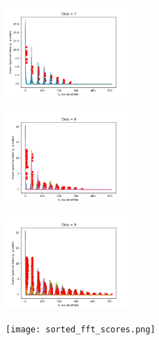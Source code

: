 \begin{center}
\includegraphics[width=0.35\textwidth]{fft_7.png}
\end{center}

\begin{center}
\includegraphics[width=0.35\textwidth]{fft_8.png}
\end{center}
    

\begin{center}
\includegraphics[width=0.35\textwidth]{fft_9.png}
\end{center}


\begin{center}
\texttt{[image: sorted\_fft\_scores.png]}
\end{center}

    
        